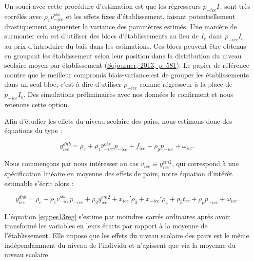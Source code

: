 \documentclass[
]{book}
\begin{document}
\quad Un souci avec cette procédure d'estimation est que les régresseurs \(p_{-ice} I_e\) sont très corrélés avec \(\rho_1 \bar{v}^{obs}_{-ice}\) et les effets fixes d'établissement, faisant potentiellement drastiquement augmenter la variance des paramètres estimés. Une manière de surmonter cela est d'utiliser des blocs d'établissements au lieu de \(I_e\) dans \(p_{-ice} I_e\) au prix d'introduire du bais dans les estimations. Ces blocs peuvent être obtenus en groupant les établissement selon leur position dans la distribution du niveau scolaire moyen par établissement (\protect\hyperlink{ref-SOJ:13}{Sojourner, 2013, p. 581}). Le papier de référence montre que le meilleur compromis biais-variance est de grouper les établissements dans un seul bloc, c'est-à-dire d'utiliser \(p_{-ice}\) comme régresseur à la place de \(p_{-ice} I_e\). Des simulations préliminaires avec nos données le confirment et nous retenons cette option.

\quad Afin d'étudier les effets du niveau scolaire des pairs, nous estimons donc des équations du type :

\begin{equation}
\label{eq:pes13reg0}
y^{dnb}_{ice} = \rho_e + \rho_1 \bar{v}^{obs}_{-ice} p_{-ice} + f_{ice}+ \rho_p p_{-ice} + \omega_{ice}.
\end{equation}

Nous commençons par nous intéresser au cas \(v_{ice} \equiv y^{cm2}_{ice}\), qui correspond à une spécification linéaire en moyenne des effets de pairs, notre équation d'intérêt estimable s'écrit alors :

\begin{equation}
\label{eq:pes13reg}
y^{dnb}_{ice} = \rho_e + \rho_1 \bar{v}^{obs}_{-ice} p_{-ice} + \rho_2 y^{cm2}_{ice} + x_{ice}' \rho_3 + \bar{x}_{-ice}' \rho_4 + \rho_5 t_{ce} + \rho_p p_{-ice} + \omega_{ice}.
\end{equation}

L'équation \eqref{eq:pes13reg} s'estime par moindres carrés ordinaires après avoir transformé les variables en leurs écarts par rapport à la moyenne de l'établissement. Elle impose que les effets du niveau scolaire des pairs est le même indépendamment du niveau de l'individu et n'agissent que via la moyenne du niveau scolaire.
\end{document}
